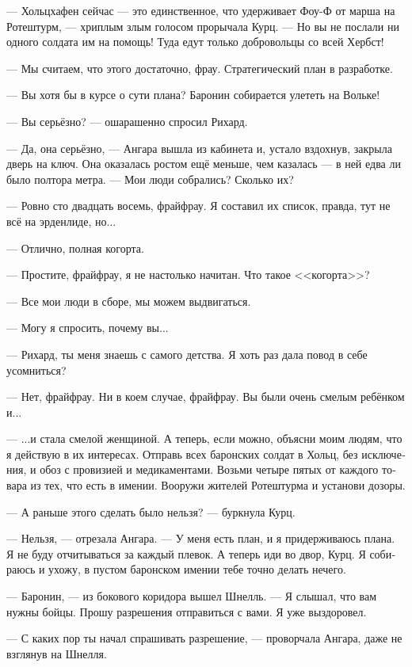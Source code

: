 \documentclass[a4paper,12pt,fleqn]{book}\usepackage{cooltooltips}\usepackage{polyglossia}\setdefaultlanguage[babelshorthands=true]{russian}\setotherlanguage{english}\defaultfontfeatures{Ligatures=TeX,Mapping=tex-text} \usepackage{xcolor}\definecolor{lightgray}{HTML}{bbbbbb}\color{lightgray}\newcommand{\ml}[3]{\textenglish{\textcolor{black}{#3}}}
\begin{document}
--- Хольцхафен сейчас --- это единственное, что удерживает Фоу-Ф от марша на Ротештурм, --- хриплым злым голосом прорычала Курц.
--- Но вы не послали ни одного солдата им на помощь!
Туда едут только добровольцы со всей Хербст!

--- Мы считаем, что этого достаточно, фрау.
Стратегический план в разработке.

--- Вы хотя бы в курсе о сути плана?
Баронин собирается улететь на Вольке!

--- Вы серьёзно? --- ошарашенно спросил Рихард.

--- Да, она серьёзно, --- Ангара вышла из кабинета и, устало вздохнув, закрыла дверь на ключ.
Она оказалась ростом ещё меньше, чем казалась --- в ней едва ли было полтора метра.
--- Мои люди собрались?
Сколько их?

--- Ровно сто двадцать восемь, фрайфрау.
Я составил их список, правда, тут не всё на эрденлиде, но...

--- Отлично, полная когорта.

--- Простите, фрайфрау, я не настолько начитан.
Что такое <<когорта>>?

--- Все мои люди в сборе, мы можем выдвигаться.

--- Могу я спросить, почему вы...

--- Рихард, ты меня знаешь с самого детства.
Я хоть раз дала повод в себе усомниться?

--- Нет, фрайфрау.
Ни в коем случае, фрайфрау.
Вы были очень смелым ребёнком и...

--- ...и стала смелой женщиной.
А теперь, если можно, объясни моим людям, что я действую в их интересах.
Отправь всех баронских солдат в Хольц, без исключения, и обоз с провизией и медикаментами.
Возьми четыре пятых от каждого товара из тех, что есть в имении.
Вооружи жителей Ротештурма и установи дозоры.

--- А раньше этого сделать было нельзя? --- буркнула Курц.

--- Нельзя, --- отрезала Ангара.
--- У меня есть план, и я придерживаюсь плана.
Я не буду отчитываться за каждый плевок.
А теперь иди во двор, Курц.
Я собираюсь и ухожу, в пустом баронском имении тебе точно делать нечего.

--- Баронин, --- из бокового коридора вышел Шнелль.
--- Я слышал, что вам нужны бойцы.
Прошу разрешения отправиться с вами.
Я уже выздоровел.

--- С каких пор ты начал спрашивать разрешение, --- проворчала Ангара, даже не взглянув на Шнелля.
\end{document}
